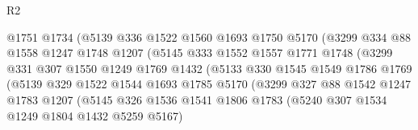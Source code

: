 \begin{lexlean}{R2}
\begin{coremodule}
                                @1751
                                @1734
                                (@5139
                                  @336
                                  @1522
                                  @1560
                                  @1693
                                  @1750
                                  @5170
                                  (@3299
                                    @334
                                    @88
                                    @1558
                                    @1247
                                    @1748
                                    @1207
                                    (@5145
                                      @333
                                      @1552
                                      @1557
                                      @1771
                                      @1748
                                      (@3299
                                        @331
                                        @307
                                        @1550
                                        @1249
                                        @1769
                                        @1432
                                        (@5133
                                          @330
                                          @1545
                                          @1549
                                          @1786
                                          @1769
                                          (@5139
                                            @329
                                            @1522
                                            @1544
                                            @1693
                                            @1785
                                            @5170
                                            (@3299
                                              @327
                                              @88
                                              @1542
                                              @1247
                                              @1783
                                              @1207
                                              (@5145
                                                @326
                                                @1536
                                                @1541
                                                @1806
                                                @1783
                                                (@5240 @307 @1534 @1249 @1804 @1432 @5259 @5167)

\end{coremodule}
\end{lexlean}
